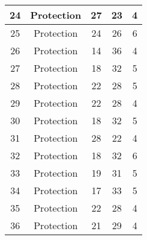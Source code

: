 \documentclass[results.tex]{subfiles}
\begin{document}
\begin{center}
\begin{tabular}{| c || c | c | c | c |}
            \hline
            24                      & Protection                   & 27                     & 23                      & 4                    \\
            \hline
            25                      & Protection                   & 24                     & 26                      & 6                    \\
            \hline
            26                      & Protection                   & 14                     & 36                      & 4                    \\
            \hline
            27                      & Protection                   & 18                     & 32                      & 5                    \\
            \hline
            28                      & Protection                   & 22                     & 28                      & 5                    \\
            \hline
            29                      & Protection                   & 22                     & 28                      & 4                    \\
            \hline
            30                      & Protection                   & 18                     & 32                      & 5                    \\
            \hline
            31                      & Protection                   & 28                     & 22                      & 4                    \\
            \hline
            32                      & Protection                   & 18                     & 32                      & 6                    \\
            \hline
            33                      & Protection                   & 19                     & 31                      & 5                    \\
            \hline
            34                      & Protection                   & 17                     & 33                      & 5                    \\
            \hline
            35                      & Protection                   & 22                     & 28                      & 4                    \\
            \hline
            36                      & Protection                   & 21                     & 29                      & 4                    \\

\end{tabular}
\end{center}
\end{document}
